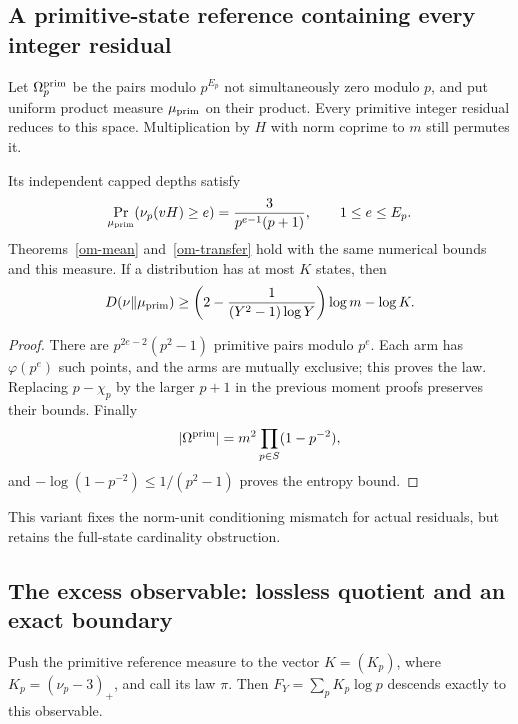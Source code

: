 \subsection{A primitive-state reference containing every integer residual}
Let $\Omega_p^{\rm prim}$ be the pairs modulo $p^{E_p}$ not simultaneously
zero modulo $p$, and put uniform product measure $\mu_{\rm prim}$ on their
product. Every primitive integer residual reduces to this space.
Multiplication by $H$ with norm coprime to $m$ still permutes it.

\begin{theorem}\label{om-primitive}
Its independent capped depths satisfy
\[
 \Pr_{\mu_{\rm prim}}(\nu_p(vH)\ge e)
       =\frac3{p^{e-1}(p+1)},\qquad1\le e\le E_p.
\]
Theorems~\ref{om-mean} and~\ref{om-transfer} hold with the same numerical
bounds and this measure. If a distribution has at most $K$ states, then
\[
 D(\nu\Vert\mu_{\rm prim})\ge
 \left(2-\frac1{(Y^2-1)\log Y}\right)\log m-\log K.
\]
\end{theorem}
\begin{proof}
There are $p^{2e-2}(p^2-1)$ primitive pairs modulo $p^e$.
Each arm has $\varphi(p^e)$ such points, and the arms are mutually
exclusive; this proves the law. Replacing $p-\chi_p$ by the larger $p+1$
in the previous moment proofs preserves their bounds. Finally
\[
 |\Omega^{\rm prim}|=m^2\prod_{p\in S}(1-p^{-2}),
\]
and $-\log(1-p^{-2})\le1/(p^2-1)$ proves the entropy bound.
\end{proof}
This variant fixes the norm-unit conditioning mismatch for actual residuals,
but retains the full-state cardinality obstruction.

\subsection{The excess observable: lossless quotient and an exact boundary}
Push the primitive reference measure to the vector $K=(K_p)$, where
$K_p=(\nu_p-3)_+$, and call its law $\pi$. Then
$F_Y=\sum_pK_p\log p$ descends exactly to this observable.

